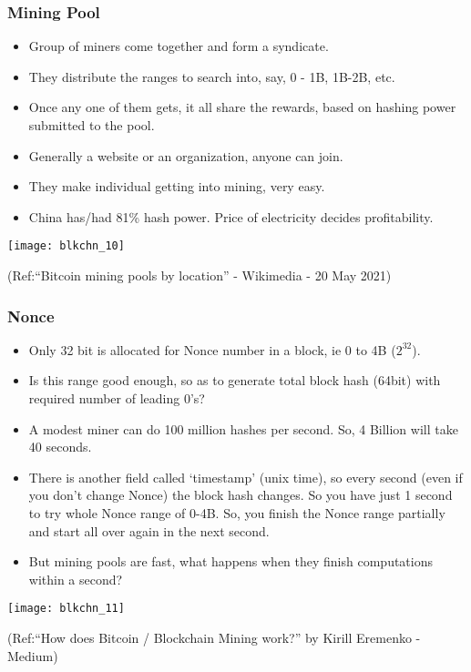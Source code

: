 \begin{frame}[fragile]\frametitle{Mining Pool}
\begin{itemize}
\item Group of miners come together and form a syndicate.
\item They distribute the ranges to search into, say, 0 - 1B, 1B-2B, etc.
\item Once any one of them gets, it all share the rewards, based on hashing power submitted to the pool.
\item Generally a website or an organization, anyone can join.
\item They make individual getting into mining, very easy. 
\item China has/had 81\% hash power. Price of electricity decides profitability.
\end{itemize}

\begin{center}
\texttt{[image: blkchn\_10]}

{\tiny (Ref:``Bitcoin mining pools by location'' - Wikimedia - 20 May 2021)}
\end{center}
\end{frame}

\begin{frame}[fragile]\frametitle{Nonce}
\begin{itemize}
\item Only 32 bit is allocated for Nonce number in a block, ie 0 to 4B ($2^{32}$).
\item Is this range good enough, so as to generate total block hash (64bit) with required number of leading 0's?
\item A modest miner can do 100 million hashes per second. So, 4 Billion will take 40 seconds.
\item There is another field called 	`timestamp' (unix time), so every second (even if you don't change Nonce) the block hash changes. So you have just 1 second to try whole Nonce range of 0-4B. So, you finish the Nonce range partially and start all over again in the next second.
\item But mining pools are fast, what happens when they finish computations within  a second?
\end{itemize}

\begin{center}
\texttt{[image: blkchn\_11]}

{\tiny (Ref:``How does Bitcoin / Blockchain Mining work?'' by Kirill Eremenko  - Medium)}
\end{center}
\end{frame}


